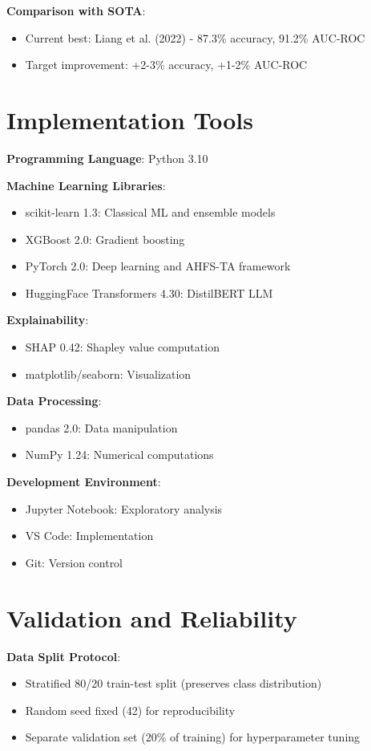 \textbf{Comparison with SOTA}:
\begin{itemize}
\item Current best: Liang et al. (2022) - 87.3\% accuracy, 91.2\% AUC-ROC
\item Target improvement: +2-3\% accuracy, +1-2\% AUC-ROC
\end{itemize}

\section{Implementation Tools}

\textbf{Programming Language}: Python 3.10

\textbf{Machine Learning Libraries}:
\begin{itemize}
\item scikit-learn 1.3: Classical ML and ensemble models
\item XGBoost 2.0: Gradient boosting
\item PyTorch 2.0: Deep learning and AHFS-TA framework
\item HuggingFace Transformers 4.30: DistilBERT LLM
\end{itemize}

\textbf{Explainability}:
\begin{itemize}
\item SHAP 0.42: Shapley value computation
\item matplotlib/seaborn: Visualization
\end{itemize}

\textbf{Data Processing}:
\begin{itemize}
\item pandas 2.0: Data manipulation
\item NumPy 1.24: Numerical computations
\end{itemize}

\textbf{Development Environment}:
\begin{itemize}
\item Jupyter Notebook: Exploratory analysis
\item VS Code: Implementation
\item Git: Version control
\end{itemize}

\section{Validation and Reliability}

\textbf{Data Split Protocol}:
\begin{itemize}
\item Stratified 80/20 train-test split (preserves class distribution)
\item Random seed fixed (42) for reproducibility
\item Separate validation set (20\% of training) for hyperparameter tuning
\end{itemize}

